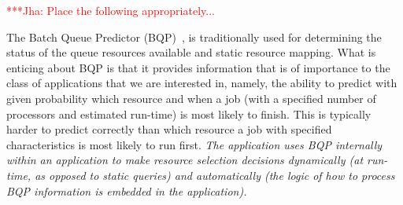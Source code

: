 \documentclass[conference,final]{IEEEtran}
\newcommand{\jhanote}[1]{ {\textcolor{red} { ***Jha: #1 }}}
\newcommand{\yyenote}[1]{ {\textcolor{blue} { ***yye00: #1 }}}
\newcommand{\jhanote}[1]{}
\newcommand{\yyenote}[1]{}
\begin{document}

\jhanote{Place the following appropriately...}

 The Batch
Queue Predictor (BQP)~\cite{bqp, bqp_url}, is traditionally used for
determining the status of the queue resources available and static
resource mapping. What is enticing about BQP is that it provides
information that is of importance to the class of applications that we
are interested in, namely, the ability to predict with given
probability which resource and when a job (with a specified number of
processors and estimated run-time) is most likely to finish.  This is
typically harder to predict correctly than which resource a job with
specified characteristics is most likely to run first.  {\it The
  application uses BQP internally within an application to make
  resource selection decisions dynamically (at run-time, as opposed to
  static queries) and automatically (the logic of how to process BQP
  information is embedded in the application).}


\end{document}
